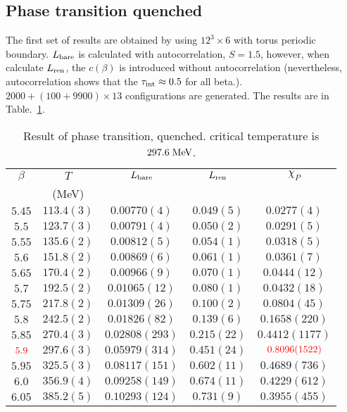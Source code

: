 \subsection{\label{resquench}Phase transition quenched}

The first set of results are obtained by using $12^3 \times 6$ with torus periodic boundary.
$L_{\rm bare}$ is calculated with autocorrelation, $S=1.5$, however, when calculate $L_{\rm ren}$, the $c(\beta)$ is introduced without autocorrelation (\textcolor[rgb]{0,0,1}{nevertheless, autocorrelation shows that the $\tau _{\rm int}\approx 0.5$ for all beta.}).
$2000+(100+9900)\times 13$ configurations are generated.
The results are in Table.~\ref{tab.res.quenchphasetransition}.


\begin{table}
\begin{center}
\begin{tabular}{c|c|c|c|c}
    \hline    
$\beta$ & $T$ & $L_{\rm bare}$ & $L_{\rm ren}$ & $\chi _P$\\
& (MeV) & & & \\
\hline
$5.45$ & $113.4(3)$ & $0.00770(4)$   & $0.049(5)$  & $0.0277(4)$ \\
\hline
$5.5$  & $123.7(3)$ & $0.00791(4)$   & $0.050(2)$  & $0.0291(5)$ \\
\hline
$5.55$ & $135.6(2)$ & $0.00812(5)$   & $0.054(1)$  & $0.0318(5)$ \\
\hline
$5.6$  & $151.8(2)$ & $0.00869(6)$   & $0.061(1)$  & $0.0361(7)$ \\
\hline
$5.65$ & $170.4(2)$ & $0.00966(9)$   & $0.070(1)$  & $0.0444(12)$ \\ 
\hline
$5.7$  & $192.5(2)$ & $0.01065(12)$  & $0.080(1)$  & $0.0432(18)$ \\
\hline
$5.75$ & $217.8(2)$ & $0.01309(26)$  & $0.100(2)$  & $0.0804(45)$ \\
\hline
$5.8$  & $242.5(2)$ & $0.01826(82)$  & $0.139(6)$  & $0.1658(220)$ \\
\hline
$5.85$ & $270.4(3)$ & $0.02808(293)$ & $0.215(22)$ & $0.4412(1177)$ \\
\hline
$\textcolor[rgb]{1,0,0}{5.9}$  & $297.6(3)$ & $0.05979(314)$ & $0.451(24)$ & $\textcolor[rgb]{1,0,0}{0.8096(1522)}$ \\
\hline
$5.95$ & $325.5(3)$ & $0.08117(151)$ & $0.602(11)$ & $0.4689(736)$ \\
\hline
$6.0$  & $356.9(4)$ & $0.09258(149)$ & $0.674(11)$ & $0.4229(612)$ \\
\hline
$6.05$ & $385.2(5)$ & $0.10293(124)$ & $0.731(9)$  & $0.3955(455)$ \\
\hline
\end{tabular}
\caption{\label{tab.res.quenchphasetransition}Result of phase transition, quenched. critical temperature is $297.6\;{\rm MeV}$.}
\end{center}
\end{table}

